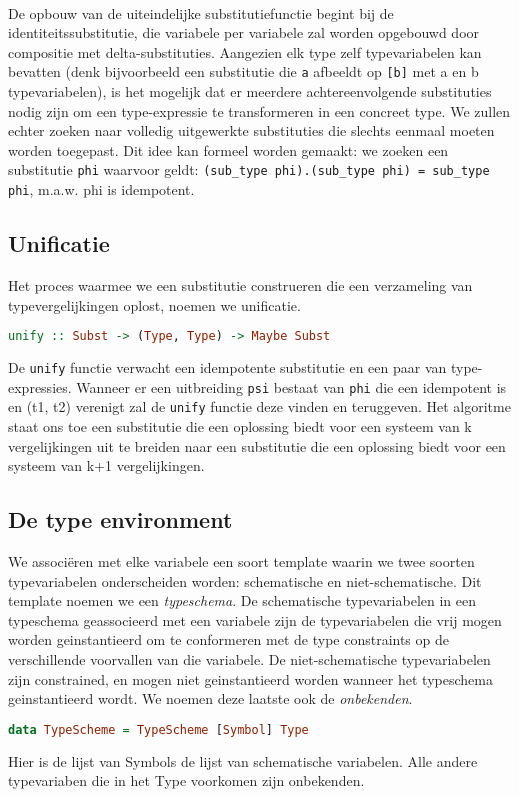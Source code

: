 \documentclass[a4paper,10pt]{article}
\begin{document}
\paragraph{}
De opbouw van de uiteindelijke substitutiefunctie begint bij de identiteitssubstitutie, die variabele per variabele zal worden opgebouwd door compositie met delta-substituties.
Aangezien elk type zelf typevariabelen kan bevatten (denk bijvoorbeeld een substitutie die \texttt{a} afbeeldt op \texttt{[b]} met a en b typevariabelen), is het mogelijk dat er meerdere achtereenvolgende substituties nodig zijn om een type-expressie te transformeren in een concreet type.
We zullen echter zoeken naar volledig uitgewerkte substituties die slechts eenmaal moeten worden toegepast.
Dit idee kan formeel worden gemaakt: we zoeken een substitutie \texttt{phi} waarvoor geldt:
\texttt{(sub\_type phi).(sub\_type phi) = sub\_type phi}, m.a.w. phi is idempotent.

\subsection{Unificatie}
Het proces waarmee we een substitutie construeren die een verzameling van typevergelijkingen oplost, noemen we unificatie.
\begin{lstlisting}[language=Haskell,frame=single]
unify :: Subst -> (Type, Type) -> Maybe Subst
\end{lstlisting}
De \texttt{unify} functie verwacht een idempotente substitutie en een paar van type-expressies.
Wanneer er een uitbreiding \texttt{psi} bestaat van \texttt{phi} die een idempotent is en (t1, t2) verenigt zal de \texttt{unify} functie deze vinden en teruggeven.
Het algoritme staat ons toe een substitutie die een oplossing biedt voor een systeem van k vergelijkingen uit te breiden naar een substitutie die een oplossing biedt voor een systeem van k+1 vergelijkingen.

\subsection{De type environment}
We associ{\"e}ren met elke variabele een soort template waarin we twee soorten typevariabelen onderscheiden worden: schematische en niet-schematische.
Dit template noemen we een \emph{typeschema}.
De schematische typevariabelen in een typeschema geassocieerd met een variabele zijn de typevariabelen die vrij mogen worden geinstantieerd om te conformeren met de type constraints op de verschillende voorvallen van die variabele.
De niet-schematische typevariabelen zijn constrained, en mogen niet geinstantieerd worden wanneer het typeschema geinstantieerd wordt.
We noemen deze laatste ook de \emph{onbekenden}.
\begin{lstlisting}[language=Haskell,frame=single]
data TypeScheme = TypeScheme [Symbol] Type
\end{lstlisting}
Hier is de lijst van Symbols de lijst van schematische variabelen.
Alle andere typevariaben die in het Type voorkomen zijn onbekenden.
\end{document}
